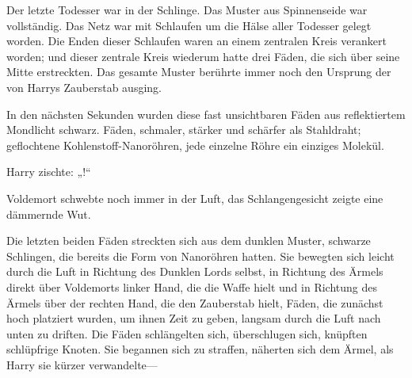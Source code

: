 Der letzte Todesser war in der Schlinge. Das Muster aus Spinnenseide war vollständig. Das Netz war mit Schlaufen um die Hälse aller Todesser gelegt worden. Die Enden dieser Schlaufen waren an einem zentralen Kreis verankert worden; und dieser zentrale Kreis wiederum hatte drei Fäden, die sich über seine Mitte erstreckten. Das gesamte Muster berührte immer noch den Ursprung der von Harrys Zauberstab ausging.

In den nächsten Sekunden wurden diese fast unsichtbaren Fäden aus reflektiertem Mondlicht schwarz.
Fäden, schmaler, stärker und schärfer als Stahldraht; geflochtene Kohlenstoff-Nanoröhren, jede einzelne Röhre ein einziges Molekül.

Harry zischte: „!“

Voldemort schwebte noch immer in der Luft, das Schlangengesicht zeigte eine dämmernde Wut.

Die letzten beiden Fäden streckten sich aus dem dunklen Muster, schwarze Schlingen, die bereits die Form von Nanoröhren hatten. Sie bewegten sich leicht durch die Luft in Richtung des Dunklen Lords selbst, in Richtung des Ärmels direkt über Voldemorts linker Hand, die die Waffe hielt und in Richtung des Ärmels über der rechten Hand, die den Zauberstab hielt, Fäden, die zunächst hoch platziert wurden, um ihnen Zeit zu geben, langsam durch die Luft nach unten zu driften. Die Fäden schlängelten sich, überschlugen sich, knüpften schlüpfrige Knoten. Sie begannen sich zu straffen, näherten sich dem Ärmel, als Harry sie kürzer verwandelte—

